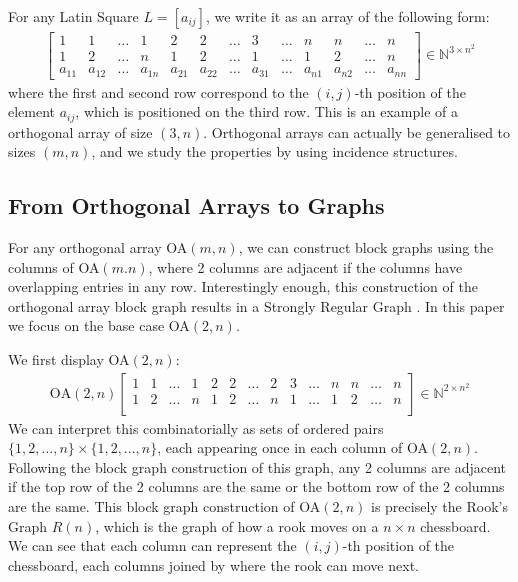 For any Latin Square $L=[a_{ij}]$, we write it as an array of the following form:
\[
\begin{aligned}
    \begin{bmatrix}
        1&1&\dots&1&2&2&\dots&3&\dots&n&n&\dots&n\\
        1&2&\dots&n&1&2&\dots&1&\dots&1&2&\dots&n\\
        a_{11}&a_{12}&\dots&a_{1n}&a_{21}&a_{22}&\dots&a_{31}&\dots&a_{n1}&a_{n2}&\dots&a_{nn}
    \end{bmatrix} \in \mathbb{N}^{3\times n^2}
\end{aligned}
\]
where the first and second row correspond to the $(i,j)$-th position of the element $a_{ij}$, which is positioned on the third row. This is an example of a orthogonal array of size $(3,n)$. Orthogonal arrays can actually be generalised to sizes $(m,n)$, and we study the properties by using incidence structures.

\subsection{From Orthogonal Arrays to Graphs}
For any orthogonal array OA$(m,n)$, we can construct block graphs using the columns of OA$(m.n)$, where 2 columns are adjacent if the columns have overlapping entries in any row. Interestingly enough, this construction of the orthogonal array block graph results in a Strongly Regular Graph \cite{Asgarli_2022}. In this paper we focus on the base case OA$(2,n)$.

We first display OA$(2,n)$:
\[
\begin{aligned}
    \text{OA}(2,n)\begin{bmatrix}
        1&1&\dots&1&2&2&\dots&2&3&\dots&n&n&\dots&n\\
        1&2&\dots&n&1&2&\dots&n&1&\dots&1&2&\dots&n\\
    \end{bmatrix} \in \mathbb{N}^{2\times n^2}
\end{aligned}
\]
We can interpret this combinatorially as sets of ordered pairs $\{1,2,\dots,n\}\times\{1,2,\dots,n\}$, each appearing once in each column of OA$(2,n)$. Following the block graph construction of this graph, any 2 columns are adjacent if the top row of the 2 columns are the same or the bottom row of the 2 columns are the same. This block graph construction of OA$(2,n)$ is precisely the Rook's Graph $R(n)$, which is the graph of how a rook moves on a $n\times n$ chessboard. We can see that each column can represent the $(i,j)$-th position of the chessboard, each columns joined by where the rook can move next.


